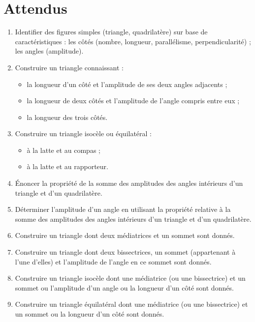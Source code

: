 \documentclass[../../syllabus_1.tex]{subfiles}
\begin{document}
\section*{Attendus}
\begin{enumerate}[label=\textbf{\arabic*.}]
    \item Identifier des figures simples (triangle, quadrilatère) sur base de caractéristiques : les côtés (nombre, longueur, parallélisme, perpendicularité) ; les angles (amplitude).
    \item Construire un triangle connaissant :
    \begin{itemize}
        \item la longueur d'un côté et l'amplitude de ses deux angles adjacents ;
        \item la longueur de deux côtés et l'amplitude de l'angle compris entre eux ;
        \item la longueur des trois côtés.
    \end{itemize}
    \item Construire un triangle isocèle ou équilatéral :
    \begin{itemize}
        \item à la latte et au compas ;
        \item à la latte et au rapporteur.
    \end{itemize}
          
    \item Énoncer la propriété de la somme des amplitudes des angles intérieurs d'un triangle et d'un quadrilatère.
    \item Déterminer l'amplitude d'un angle en utilisant la propriété relative à la somme des amplitudes des angles intérieurs d'un triangle et d'un quadrilatère.
    \item Construire un triangle dont deux médiatrices et un sommet sont donnés.
    \item Construire un triangle dont deux bissectrices, un sommet (appartenant à l'une d'elles) et l'amplitude de l'angle en ce sommet sont donnés.
    \item Construire un triangle isocèle dont une médiatrice (ou une bissectrice) et un sommet ou l'amplitude d'un angle ou la longueur d'un côté sont donnés.
    \item Construire un triangle équilatéral dont une médiatrice (ou une bissectrice) et un sommet ou la longueur d'un côté sont donnés.
\end{enumerate}
\end{document}
